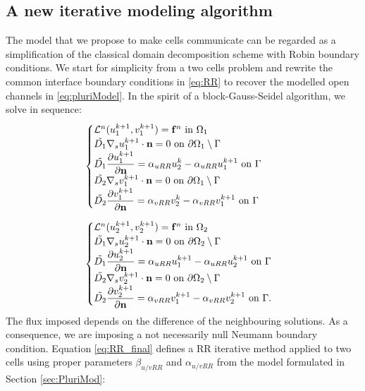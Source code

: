 \subsection{A new iterative modeling algorithm}\label{sec:RRmodified}
The model that we propose to make cells communicate can be regarded as a simplification of the classical domain decomposition scheme with Robin boundary conditions. We start for simplicity from a two cells problem and rewrite the common interface boundary conditions in \eqref{eq:RR} to recover the modelled open channels in \eqref{eq:pluriModel}. In the spirit of a block-Gauss-Seidel algorithm, we solve in sequence:
\begin{equation} \label{eq:RR_final}
\begin{aligned}
& \begin{cases}
\mathcal{L}^n (u_1^{k+1}, v_1^{k+1}) = \mathbf{f}^n \ \text{in} \ \Omega_1 \\
\Tilde{D_1} \nabla_s u_1^{k+1} \cdot \mathbf{n} = 0 \ \text{on} \ \partial \Omega_1 \setminus \Gamma \\
\Tilde{D_1} \displaystyle{\partial u_1^{k+1}\over\partial \mathbf{n}} = \alpha_{uRR} u_2^{k} - \alpha_{uRR} u_1^{k+1} \ \text{on} \ \Gamma \\
\Tilde{D_2} \nabla_s v_1^{k+1} \cdot \mathbf{n} = 0 \ \text{on} \ \partial \Omega_1 \setminus \Gamma \\
\Tilde{D_2} \displaystyle{\partial v_1^{k+1}\over\partial \mathbf{n}} = \alpha_{vRR} v_2^{k} -\alpha_{vRR} v_1^{k+1} \ \text{on} \ \Gamma
\end{cases}
\\[6pt]
& \begin{cases}
\mathcal{L}^n (u_2^{k+1}, v_2^{k+1}) = \mathbf{f}^n \ \text{in} \ \Omega_2 \\
\Tilde{D_1} \nabla_s u_2^{k+1} \cdot \mathbf{n} = 0 \ \text{on} \ \partial \Omega_2 \setminus \Gamma \\
\Tilde{D_1} \displaystyle{\partial u_2^{k+1}\over\partial \mathbf{n}} = \alpha_{uRR} u_1^{k+1} - \alpha_{uRR} u_2^{k+1} \ \text{on} \ \Gamma \\
\Tilde{D_2} \nabla_s v_2^{k+1} \cdot \mathbf{n} = 0 \ \text{on} \ \partial \Omega_2 \setminus \Gamma\\
\Tilde{D_2} \displaystyle{\partial v_2^{k+1}\over\partial \mathbf{n}} = \alpha_{vRR} v_1^{k+1} -\alpha_{vRR} v_2^{k+1} \ \text{on} \ \Gamma.
\end{cases}
\end{aligned}\end{equation}
The flux imposed depends on the difference of the neighbouring solutions. As a consequence, we are imposing a not necessarily null Neumann boundary condition. Equation \eqref{eq:RR_final} defines a RR iterative method applied to two cells using proper parameters $\beta_{u/vRR}$ and $\alpha_{u/v RR}$ from the model formulated in Section \ref{sec:PluriMod}:

